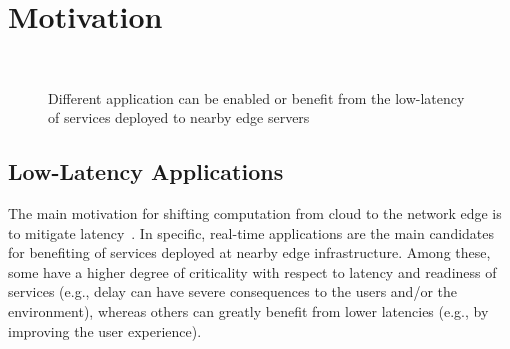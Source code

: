 \section{Motivation}\label{sec:motivation}

\begin{figure}[tbp]
	\centering
	\hfill
	~
	\hfill
	\caption{Different application can be enabled or benefit from the low-latency of services deployed to nearby edge servers} \label{fig:motivational-cases}
\end{figure}

\subsection{Low-Latency Applications}

The main motivation for shifting computation from cloud to the network edge is to mitigate latency~\cite{Bonomi2014}. In specific, real-time applications are the main candidates for benefiting of services deployed at nearby edge infrastructure. Among these, some have a higher degree of criticality with respect to latency and readiness of services (e.g., delay can have severe consequences to the users and/or the environment), whereas others can greatly benefit from lower latencies (e.g., by improving the user experience).

